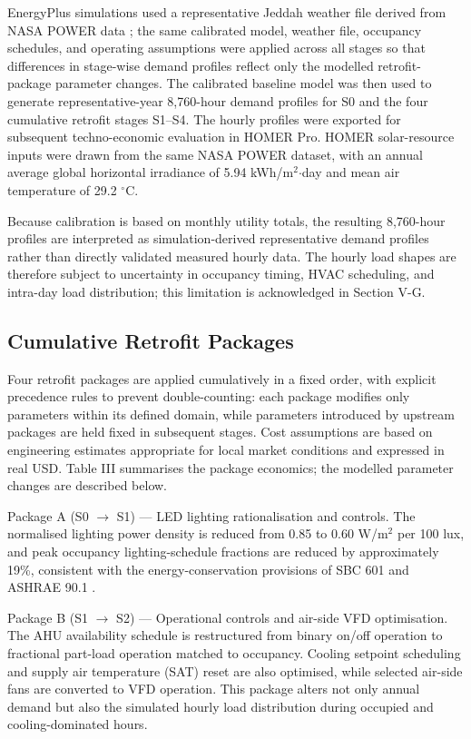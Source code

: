\documentclass[journal,fleqn]{IEEEtran}
\begin{document}
EnergyPlus simulations used a representative Jeddah weather file derived from NASA POWER data \cite{ref24}; the same calibrated model, weather file, occupancy schedules, and operating assumptions were applied across all stages so that differences in stage-wise demand profiles reflect only the modelled retrofit-package parameter changes. The calibrated baseline model was then used to generate representative-year 8,760-hour demand profiles for S0 and the four cumulative retrofit stages S1--S4. The hourly profiles were exported for subsequent techno-economic evaluation in HOMER Pro. HOMER solar-resource inputs were drawn from the same NASA POWER dataset, with an annual average global horizontal irradiance of 5.94 kWh/m$^{2}$$\cdot$day and mean air temperature of 29.2 $^{\circ}$C.


Because calibration is based on monthly utility totals, the resulting 8,760-hour profiles are interpreted as simulation-derived representative demand profiles rather than directly validated measured hourly data. The hourly load shapes are therefore subject to uncertainty in occupancy timing, HVAC scheduling, and intra-day load distribution; this limitation is acknowledged in Section V-G.


\subsection{Cumulative Retrofit Packages}

Four retrofit packages are applied cumulatively in a fixed order, with explicit precedence rules to prevent double-counting: each package modifies only parameters within its defined domain, while parameters introduced by upstream packages are held fixed in subsequent stages. Cost assumptions are based on engineering estimates appropriate for local market conditions and expressed in real USD. Table III summarises the package economics; the modelled parameter changes are described below.


Package A (S0 $\rightarrow$ S1) --- LED lighting rationalisation and controls. The normalised lighting power density is reduced from 0.85 to 0.60 W/m$^{2}$ per 100 lux, and peak occupancy lighting-schedule fractions are reduced by approximately 19\%, consistent with the energy-conservation provisions of SBC 601 \cite{ref18} and ASHRAE 90.1 \cite{ref19}.


Package B (S1 $\rightarrow$ S2) --- Operational controls and air-side VFD optimisation. The AHU availability schedule is restructured from binary on/off operation to fractional part-load operation matched to occupancy. Cooling setpoint scheduling and supply air temperature (SAT) reset are also optimised, while selected air-side fans are converted to VFD operation. This package alters not only annual demand but also the simulated hourly load distribution during occupied and cooling-dominated hours.
\end{document}
